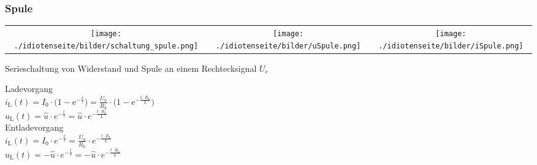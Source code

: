 \subsubsection{Spule}
\begin{tabular}{ccc} 
	\texttt{[image: ./idiotenseite/bilder/schaltung\_spule.png]} &
	\texttt{[image: ./idiotenseite/bilder/uSpule.png]} &
	\texttt{[image: ./idiotenseite/bilder/iSpule.png]}\\	
\end{tabular}
Serieschaltung von Widerstand und Spule an einem Rechtecksignal $U_e$
\begin{multicols}{2}
	Ladevorgang\\
	$i_{\mathrm{L}} (t) = I_0 \cdot \biggl(1 - \mathrm{e}^{-
	\frac{t}{\tau}}\biggr) = \frac{U_0}{R_{\mathrm{L}}} \cdot \biggl(1 -
	\mathrm{e}^{- \frac{t \cdot R_{\mathrm{L}}}{L}}\biggr)$\\
	$u_{\mathrm{L}} (t) = \hat u \cdot e^{- \frac{t}{\tau}} = \hat u \cdot e^{-
	\frac{t \cdot R_{\mathrm{L}}}{L}}$\\
	\newline
	Entladevorgang\\
	$i_{\mathrm{L}} (t) = I_0 \cdot e^{- \frac{t}{\tau}} =
	\frac{U_0}{R_{\mathrm{L}}} \cdot e^{- \frac{t \cdot
	R_{\mathrm{L}}}{L}}$\\
	$u_{\mathrm{L}} (t) = - \hat u \cdot e^{- \frac{t}{\tau}} = - \hat u \cdot
	e^{- \frac{t \cdot R_{\mathrm{L}}}{L}}$\\
\end{multicols}


